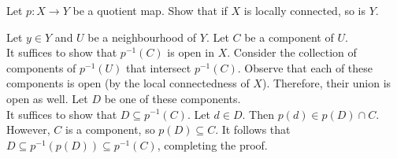 	\setcounter{exercise}{7}
	\begin{exercise}
		Let $p:X\to Y$ be a quotient map. Show that if $X$ is locally connected, so is $Y$.
	\end{exercise}
	\begin{solution*}
		Let $y\in Y$ and $U$ be a neighbourhood of $Y$. Let $C$ be a component of $U$.\\
		It suffices to show that $p^{-1}(C)$ is open in $X$.
		Consider the collection of components of $p^{-1}(U)$ that intersect $p^{-1}(C)$. Observe that each of these components is open (by the local connectedness of $X$). Therefore, their union is open as well. Let $D$ be one of these components.\\
		It suffices to show that $D\subseteq p^{-1}(C)$. Let $d\in D$. Then $p(d) \in p(D)\cap C$. However, $C$ is a component, so $p(D)\subseteq C$. It follows that $D\subseteq p^{-1}(p(D)) \subseteq p^{-1}(C)$, completing the proof.
	\end{solution*}